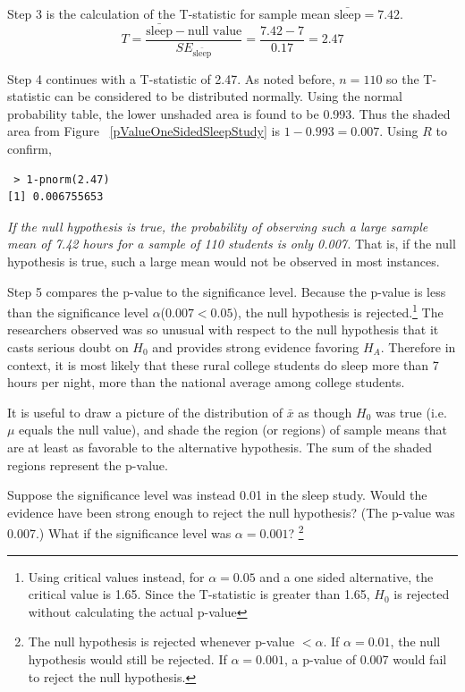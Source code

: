 Step 3 is the calculation of the T-statistic for sample mean $\bar{\mathrm{sleep}} = 7.42$. 
\[ T = \frac{\bar{\mathrm{sleep}} - \text{null value}}{SE_{\bar{\mathrm{sleep}}}} = \frac{7.42 - 7}{0.17} = 2.47\]

Step 4 continues with a T-statistic of 2.47. As noted before, $n=110$ so the T-statistic can be considered to be distributed normally. Using the normal probability table, the lower unshaded area is found to be 0.993. Thus the shaded area from Figure ~\ref{pValueOneSidedSleepStudy} is $1-0.993 = 0.007$. Using $R$ to confirm,
 \begin{verbatim} 
 > 1-pnorm(2.47)
[1] 0.006755653 
\end{verbatim}
{\em If the null hypothesis is true, the probability of observing such a large sample mean of 7.42 hours for a sample of 110 students is only 0.007.} That is, if the null hypothesis is true, such a large mean would not be observed in most instances. 

Step 5 compares the p-value to the significance level. Because the p-value is less than the significance level $\alpha$($0.007 < 0.05$), the null hypothesis is rejected.\footnote{Using critical values instead, for $\alpha=0.05$ and a one sided alternative, the critical value is 1.65. Since the T-statistic is greater than 1.65, $H_0$ is rejected without calculating the actual p-value} The researchers observed was so unusual with respect to the null hypothesis that it casts serious doubt on $H_0$ and provides strong evidence favoring $H_A$. Therefore in context, it is most likely that these rural college students do sleep more than 7 hours per night, more than the national average among college students. 

\begin{tipBox}{
It is useful to draw a picture of the distribution of $\bar{x}$ as though $H_0$ was true (i.e. $\mu$ equals the null value), and shade the region (or regions) of sample means that are at least as favorable to the alternative hypothesis. The sum of the shaded regions represent the p-value.}
\end{tipBox}

\begin{exercise}
Suppose the significance level was instead 0.01 in the sleep study. Would the evidence have been strong enough to reject the null hypothesis? (The p-value was 0.007.) What if the significance level was $\alpha = 0.001$? \footnote{The null hypothesis is rejected whenever p-value $< \alpha$. If $\alpha = 0.01$, the null hypothesis would still be rejected. If $\alpha = 0.001$, a p-value of 0.007 would fail to reject the null hypothesis.}
\end{exercise}
















